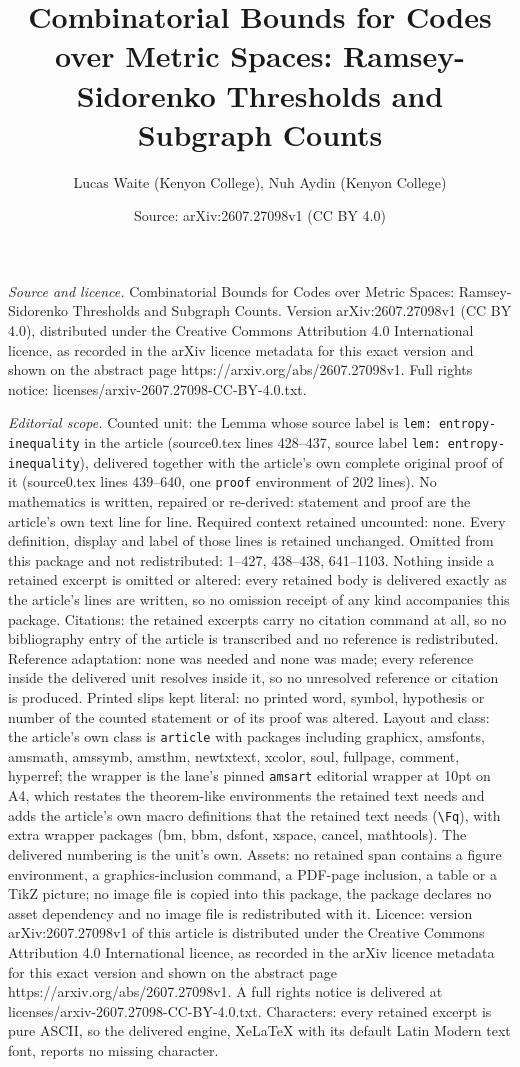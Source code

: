 \documentclass[10pt,a4paper]{amsart}
\title[Combinatorial Bounds for Codes over Metric Spaces: Ramsey-Si]{Combinatorial Bounds for Codes over Metric Spaces: Ramsey-Sidorenko Thresholds and Subgraph Counts}
\author{Lucas Waite (Kenyon College), Nuh Aydin (Kenyon College)}
\date{Source: arXiv:2607.27098v1 (CC BY 4.0)}
\begin{document}
\maketitle

\noindent\emph{Source and licence.} Combinatorial Bounds for Codes over Metric Spaces: Ramsey-Sidorenko Thresholds and Subgraph Counts. Version arXiv:2607.27098v1 (CC BY 4.0), distributed under the Creative Commons Attribution 4.0 International licence, as recorded in the arXiv licence metadata for this exact version and shown on the abstract page https://arxiv.org/abs/2607.27098v1. Full rights notice: licenses/arxiv-2607.27098-CC-BY-4.0.txt.\par\smallskip

\noindent\textit{Editorial scope.} Counted unit: the Lemma whose source label is \texttt{lem: entropy-inequality} in the article (source0.tex lines 428--437, source label \texttt{lem: entropy-inequality}), delivered together with the article's own complete original proof of it (source0.tex lines 439--640, one \texttt{proof} environment of 202 lines). No mathematics is written, repaired or re-derived: statement and proof are the article's own text line for line. Required context retained uncounted: none. Every definition, display and label of those lines is retained unchanged. Omitted from this package and not redistributed: 1--427, 438--438, 641--1103. Nothing inside a retained excerpt is omitted or altered: every retained body is delivered exactly as the article's lines are written, so no omission receipt of any kind accompanies this package. Citations: the retained excerpts carry no citation command at all, so no bibliography entry of the article is transcribed and no reference is redistributed. Reference adaptation: none was needed and none was made; every reference inside the delivered unit resolves inside it, so no unresolved reference or citation is produced. Printed slips kept literal: no printed word, symbol, hypothesis or number of the counted statement or of its proof was altered. Layout and class: the article's own class is \texttt{article} with packages including graphicx, amsfonts, amsmath, amssymb, amsthm, newtxtext, xcolor, soul, fullpage, comment, hyperref; the wrapper is the lane's pinned \texttt{amsart} editorial wrapper at 10pt on A4, which restates the theorem-like environments the retained text needs and adds the article's own macro definitions that the retained text needs (\texttt{\textbackslash Fq}), with extra wrapper packages (bm, bbm, dsfont, xspace, cancel, mathtools). The delivered numbering is the unit's own. Assets: no retained span contains a figure environment, a graphics-inclusion command, a PDF-page inclusion, a table or a TikZ picture; no image file is copied into this package, the package declares no asset dependency and no image file is redistributed with it. Licence: version arXiv:2607.27098v1 of this article is distributed under the Creative Commons Attribution 4.0 International licence, as recorded in the arXiv licence metadata for this exact version and shown on the abstract page https://arxiv.org/abs/2607.27098v1. A full rights notice is delivered at licenses/arxiv-2607.27098-CC-BY-4.0.txt. Characters: every retained excerpt is pure ASCII, so the delivered engine, XeLaTeX with its default Latin Modern text font, reports no missing character.
\end{document}
